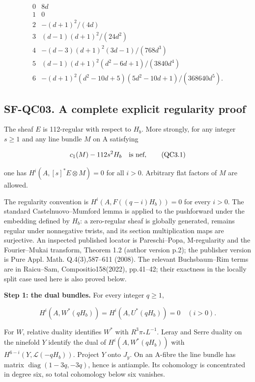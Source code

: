 \[
\begin{array}{c|l}
0&8d\\
1&0\\
2&-(d+1)^2/(4d)\\
3&(d-1)(d+1)^2/(24d^2)\\
4&-(d-3)(d+1)^2(3d-1)/(768d^3)\\
5&(d-1)(d+1)^2(d^2-6d+1)/(3840d^4)\\
6&-(d+1)^2(d^2-10d+5)(5d^2-10d+1)/(368640d^5).
\end{array}
\tag{QC2.7}
\]

\subsection{SF-QC03. A complete explicit regularity
proof}\label{SF-QC03}

The sheaf \(E\) is 112-regular with respect to \(H_b\). More strongly,
for any integer \(s\ge 1\) and any line bundle \(M\) on A satisfying

\[
 c_1(M)-112s^2H_b\quad\hbox{is nef},
 \tag{QC3.1}
\]

one has \(H^i(A,[s]^*E\otimes M)=0\) for all \(i>0\). Arbitrary flat
factors of \(M\) are allowed.

The regularity convention is \(H^i(A,F((q-i)H_b))=0\) for every \(i>0\).
The standard Castelnuovo--Mumford lemma is applied to the pushforward
under the embedding defined by \(H_b\): a zero-regular sheaf is globally
generated, remains regular under nonnegative twists, and its section
multiplication maps are surjective. An inspected published locator is
Pareschi--Popa, M-regularity and the Fourier--Mukai transform, Theorem
1.2 (author version p.2); the publisher version is Pure Appl. Math.
Q.4(3),587--611 (2008). The relevant Buchsbaum--Rim terms are in
Raicu--Sam, Compositio158(2022), pp.41--42; their exactness in the
locally split case used here is also proved below.

\textbf{Step 1: the dual bundles.} For every integer \(q\ge 1\),

\[
 H^i(A,W^*(qH_b))=H^i(A,U^*(qH_b))=0\quad(i>0).
 \tag{QC3.2}
\]

For \(W\), relative duality identifies \(W^*\) with \(R^3\pi_*L^{-1}\).
Leray and Serre duality on the ninefold \(Y\) identify the dual of
\(H^i(A,W^*(qH_b))\) with \(H^{6-i}(Y,\mathcal L(-qH_b))\). Project
\(Y\) onto \(J_y\). On an A-fibre the line bundle has matrix
\(\operatorname{diag}(1-3q,-3q)\), hence is antiample. Its cohomology is
concentrated in degree six, so total cohomology below six vanishes.

